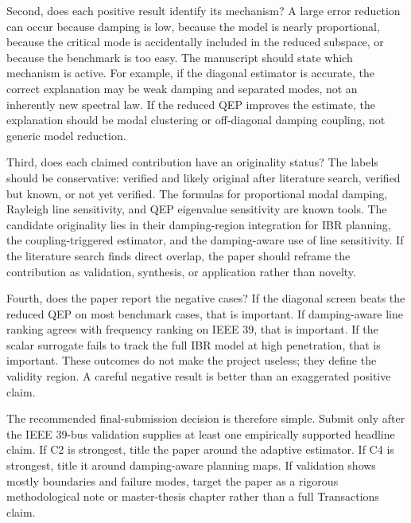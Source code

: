 \documentclass[journal]{IEEEtran}
\begin{document}
Second, does each positive result identify its mechanism? A large error reduction can occur because damping is low, because the model is nearly proportional, because the critical mode is accidentally included in the reduced subspace, or because the benchmark is too easy. The manuscript should state which mechanism is active. For example, if the diagonal estimator is accurate, the correct explanation may be weak damping and separated modes, not an inherently new spectral law. If the reduced QEP improves the estimate, the explanation should be modal clustering or off-diagonal damping coupling, not generic model reduction.

Third, does each claimed contribution have an originality status? The labels should be conservative: verified and likely original after literature search, verified but known, or not yet verified. The formulas for proportional modal damping, Rayleigh line sensitivity, and QEP eigenvalue sensitivity are known tools. The candidate originality lies in their damping-region integration for IBR planning, the coupling-triggered estimator, and the damping-aware use of line sensitivity. If the literature search finds direct overlap, the paper should reframe the contribution as validation, synthesis, or application rather than novelty.

Fourth, does the paper report the negative cases? If the diagonal screen beats the reduced QEP on most benchmark cases, that is important. If damping-aware line ranking agrees with frequency ranking on IEEE 39, that is important. If the scalar surrogate fails to track the full IBR model at high penetration, that is important. These outcomes do not make the project useless; they define the validity region. A careful negative result is better than an exaggerated positive claim.

The recommended final-submission decision is therefore simple. Submit only after the IEEE 39-bus validation supplies at least one empirically supported headline claim. If C2 is strongest, title the paper around the adaptive estimator. If C4 is strongest, title it around damping-aware planning maps. If validation shows mostly boundaries and failure modes, target the paper as a rigorous methodological note or master-thesis chapter rather than a full Transactions claim.



\end{document}
